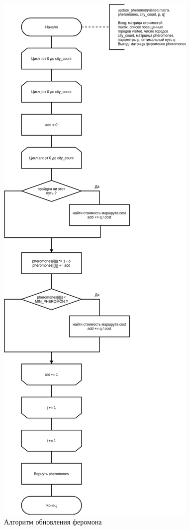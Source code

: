 \begin{figure}[!h]
	\centering
	\includegraphics[scale=0.4]{images/update.png}
	\caption{Алгоритм обновления феромона}
	\label{img:update}
\end{figure}

